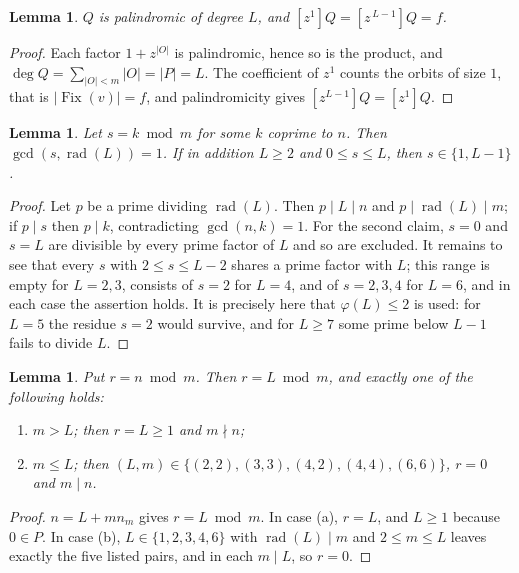 \documentclass[11pt,a4paper]{article}
\theoremstyle{plain}
\newtheorem{lemma}[theorem]{Lemma}
\theoremstyle{definition}
\theoremstyle{remark}
\newcommand{\Fix}{\operatorname{Fix}}
\newcommand{\rad}{\operatorname{rad}}
\begin{document}
\begin{lemma}\label{lem:Q}
$Q$ is palindromic of degree $L$, and $[z^{1}]Q=[z^{\,L-1}]Q=f$.
\end{lemma}

\begin{proof}
Each factor $1+z^{|O|}$ is palindromic, hence so is the product, and
$\deg Q=\sum_{|O|<m}|O|=|P|=L$. The coefficient of $z^{1}$ counts the orbits of size $1$,
that is $|\Fix(v)|=f$, and palindromicity gives $[z^{L-1}]Q=[z^{1}]Q$.
\end{proof}

\begin{lemma}\label{lem:residuesL}
Let $s=k\bmod m$ for some $k$ coprime to $n$. Then $\gcd(s,\rad(L))=1$. If in addition
$L\ge2$ and $0\le s\le L$, then $s\in\{1,L-1\}$.
\end{lemma}

\begin{proof}
Let $p$ be a prime dividing $\rad(L)$. Then $p\mid L\mid n$ and $p\mid\rad(L)\mid m$; if
$p\mid s$ then $p\mid k$, contradicting $\gcd(n,k)=1$. For the second claim, $s=0$ and $s=L$
are divisible by every prime factor of $L$ and so are excluded. It remains to see that every
$s$ with $2\le s\le L-2$ shares a prime factor with $L$; this range is empty for $L=2,3$,
consists of $s=2$ for $L=4$, and of $s=2,3,4$ for $L=6$, and in each case the assertion
holds. It is precisely here that $\varphi(L)\le2$ is used: for $L=5$ the residue $s=2$ would
survive, and for $L\ge7$ some prime below $L-1$ fails to divide $L$.
\end{proof}

\begin{lemma}\label{lem:dichotomy}
Put $r=n\bmod m$. Then $r=L\bmod m$, and exactly one of the following holds:
\begin{enumerate}
\item[\textup{(a)}] $m>L$; then $r=L\ge1$ and $m\nmid n$;
\item[\textup{(b)}] $m\le L$; then $(L,m)\in\{(2,2),(3,3),(4,2),(4,4),(6,6)\}$, $r=0$ and
      $m\mid n$.
\end{enumerate}
\end{lemma}

\begin{proof}
$n=L+mn_m$ gives $r=L\bmod m$. In case (a), $r=L$, and $L\ge1$ because $0\in P$. In case
(b), $L\in\{1,2,3,4,6\}$ with $\rad(L)\mid m$ and $2\le m\le L$ leaves exactly the five
listed pairs, and in each $m\mid L$, so $r=0$.
\end{proof}
\end{document}
